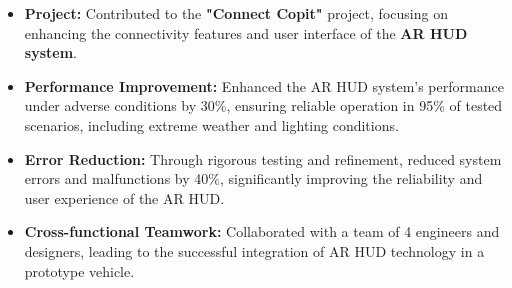 \documentclass[10pt,a4paper,ragged2e]{altacv}
\begin{document}

\begin{fullwidth}
\makecvheader
\end{fullwidth}




\begin{itemize}
\item \textbf{Project:} Contributed to the \textbf{"Connect Copit"} project, focusing on enhancing the connectivity features and user interface of the \textbf{AR HUD system}.
\item \textbf{Performance Improvement:} Enhanced the AR HUD system's performance under adverse conditions by 30\%, ensuring reliable operation in 95\% of tested scenarios, including extreme weather and lighting conditions.
\smallskip
\item \textbf{Error Reduction:} Through rigorous testing and refinement, reduced system errors and malfunctions by 40\%, significantly improving the reliability and user experience of the AR HUD.
\smallskip
\item \textbf{Cross-functional Teamwork:} Collaborated with a team of 4 engineers and designers, leading to the successful integration of AR HUD technology in a prototype vehicle.
\smallskip
\end{itemize}
\\
\end{document}
